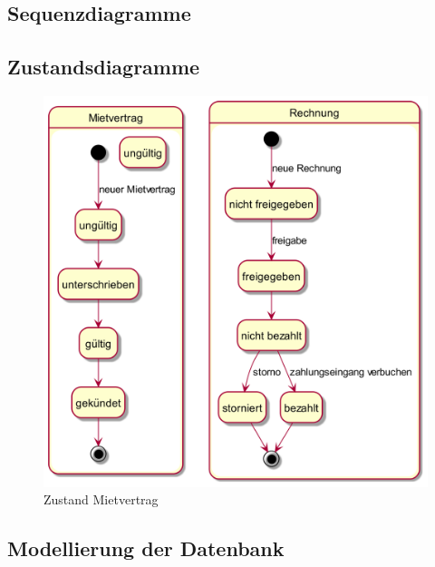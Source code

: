 \newpage
\subsection{Sequenzdiagramme}


\subsection{Zustandsdiagramme}
\begin{figure}[H]
  \begin{center}
    \includegraphics[height=0.6\textheight]{content/diagrams/out/zustand/mietvertragRechnung/mietvertragRechnung.png}
    \caption{Zustand Mietvertrag}
    \label{zustMietvertrag}
  \end{center}
\end{figure}

\subsection{Modellierung der Datenbank}

